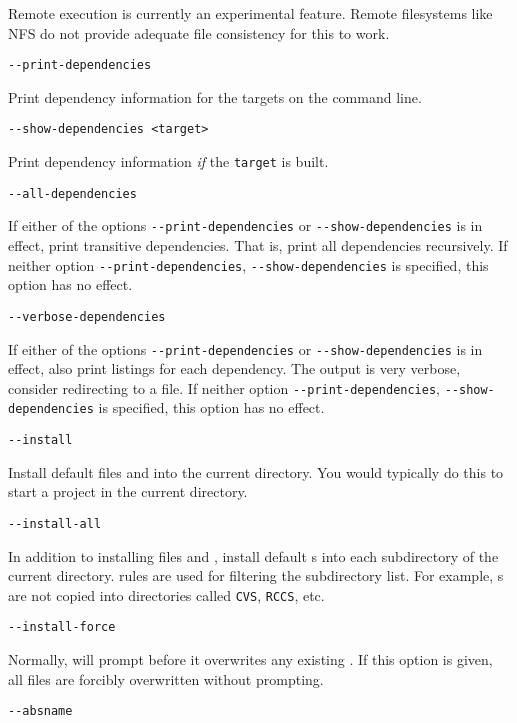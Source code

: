 Remote execution is currently an experimental feature.  Remote filesystems like NFS do not provide
adequate file consistency for this to work.

 \verb+--print-dependencies+

Print dependency information for the targets on the command line.

 \verb+--show-dependencies <target>+

Print dependency information \emph{if} the \verb+target+ is built.

 \verb+--all-dependencies+

If either of the options \texttt{-{}-print-dependencies} or
\texttt{-{}-show-dependencies} is in effect, print transitive dependencies.  That is, print all
dependencies recursively.  If neither option \texttt{-{}-print-dependencies},
\texttt{-{}-show-dependencies} is specified, this option has no effect.

 \verb+--verbose-dependencies+

If either of the options \texttt{-{}-print-dependencies} or
\texttt{-{}-show-dependencies} is in effect, also print listings for each dependency.  The output is
very verbose, consider redirecting to a file.  If neither option \texttt{-{}-print-dependencies},
\texttt{-{}-show-dependencies} is specified, this option has no effect.

 \verb+--install+

Install default files  and  into the current directory.  You would
typically do this to start a project in the current directory.

 \verb+--install-all+

In addition to installing files  and , install default
s into each subdirectory of the current directory.   rules are used for
filtering the subdirectory list.  For example, s are not copied into directories
called \verb+CVS+, \verb+RCCS+, etc.

 \verb+--install-force+

Normally,  will prompt before it overwrites any existing .  If this
option is given, all files are forcibly overwritten without prompting.

 \verb+--absname+

